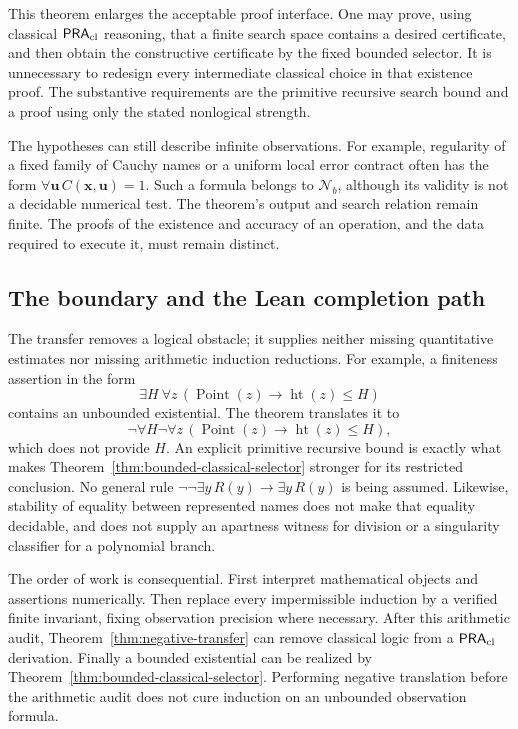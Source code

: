 This theorem enlarges the acceptable proof interface. One may prove, using
classical \(\mathsf{PRA}_{\mathrm{cl}}\) reasoning, that a finite search space contains a desired
certificate, and then obtain the constructive certificate by the fixed
bounded selector. It is unnecessary to redesign every intermediate
classical choice in that existence proof. The substantive requirements are
the primitive recursive search bound and a proof using only the stated
nonlogical strength.

The hypotheses can still describe infinite observations. For example,
regularity of a fixed family of Cauchy names or a uniform local error
contract often has the form \(\forall\mathbf u\,C(\mathbf x,\mathbf u)=1\).
Such a formula belongs to \(\mathcal N_b\), although its validity is not a
decidable numerical test. The theorem's output and search relation remain
finite. The proofs of the existence and accuracy of an operation, and the
data required to execute it, must remain distinct.

\subsection{The boundary and the Lean completion path}

The transfer removes a logical obstacle; it supplies neither missing
quantitative estimates nor missing arithmetic induction reductions. For
example, a finiteness assertion in the form
\[
 \exists H\ \forall z\,
   (\operatorname{Point}(z)\to\operatorname{ht}(z)\le H)
\]
contains an unbounded existential. The theorem translates it to
\[
 \neg\forall H\neg\forall z\,
   (\operatorname{Point}(z)\to\operatorname{ht}(z)\le H),
\]
which does not provide \(H\). An explicit primitive recursive bound is
exactly what makes Theorem~\ref{thm:bounded-classical-selector} stronger
for its restricted conclusion. No general rule
\(\neg\neg\exists y\,R(y)\to\exists y\,R(y)\) is being assumed.
Likewise, stability of equality between represented names does not make
that equality decidable, and does not supply an apartness witness for
division or a singularity classifier for a polynomial branch.

The order of work is consequential. First interpret mathematical objects
and assertions numerically. Then replace every impermissible induction by
a verified finite invariant, fixing observation precision where necessary.
After this arithmetic audit, Theorem~\ref{thm:negative-transfer} can remove
classical logic from a \(\mathsf{PRA}_{\mathrm{cl}}\) derivation. Finally a bounded existential
can be realized by Theorem~\ref{thm:bounded-classical-selector}.
Performing negative translation before the arithmetic audit does not cure
induction on an unbounded observation formula.

